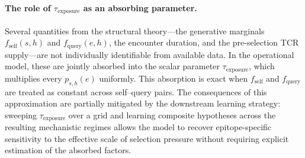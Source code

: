 \documentclass[11pt]{article}
\begin{document}
\paragraph{The role of \(\tau_{\mathrm{exposure}}\) as an absorbing parameter.}
Several quantities from the structural theory---the generative marginals \(f_{\mathrm{self}}(s,h)\) and \(f_{\mathrm{query}}(e,h)\), the encounter duration, and the pre-selection TCR supply---are not individually identifiable from available data. In the operational model, these are jointly absorbed into the scalar parameter \(\tau_{\mathrm{exposure}}\), which multiplies every \(p_{s,h}(e)\) uniformly. This absorption is exact when \(f_{\mathrm{self}}\) and \(f_{\mathrm{query}}\) are treated as constant across self--query pairs. The consequences of this approximation are partially mitigated by the downstream learning strategy: sweeping \(\tau_{\mathrm{exposure}}\) over a grid and learning composite hypotheses across the resulting mechanistic regimes allows the model to recover epitope-specific sensitivity to the effective scale of selection pressure without requiring explicit estimation of the absorbed factors.
\end{document}
